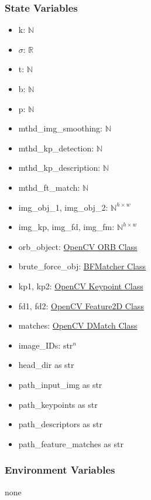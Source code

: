 \documentclass[12pt, titlepage]{article}
\begin{document}
\subsubsection{State Variables}
\begin{itemize}
  \item k: $\mathbb{N}$
  \item $\sigma$: $\mathbb{R}$
  \item t: $\mathbb{N}$
  \item b: $\mathbb{N}$
  \item p: $\mathbb{N}$
  \item mthd\_img\_smoothing: $\mathbb{N}$
  \item mthd\_kp\_detection: $\mathbb{N}$
  \item mthd\_kp\_description: $\mathbb{N}$
  \item mthd\_ft\_match: $\mathbb{N}$
  \item img\_obj\_1, img\_obj\_2: $\mathbb{N}^{h \times w}$ 
  \item img\_kp, img\_fd, img\_fm: $\mathbb{N}^{h \times w}$
  \item orb\_object: \href{https://docs.opencv.org/3.4/db/d95/classcv_1_1ORB.html}{OpenCV ORB Class}
  \item brute\_force\_obj: \href{https://docs.opencv.org/3.4/d3/da1/classcv_1_1BFMatcher.html}{BFMatcher Class}
  \item kp1, kp2: \href{https://docs.opencv.org/3.4/d2/d29/classcv_1_1KeyPoint.html}{OpenCV Keypoint Class}
  \item fd1, fd2: \href{https://docs.opencv.org/4.x/d0/d13/classcv_1_1Feature2D.html}{OpenCV Feature2D Class}
  \item matches: \href{https://docs.opencv.org/3.4/d4/de0/classcv_1_1DMatch.html}{OpenCV DMatch Class}
  \item image\_IDs: str$^{n}$
  \item head\_dir as str
  \item path\_input\_img as str 
  \item path\_keypoints as str
  \item path\_descriptors as str
  \item path\_feature\_matches as str
\end{itemize}



\subsubsection{Environment Variables}
none
\end{document}
